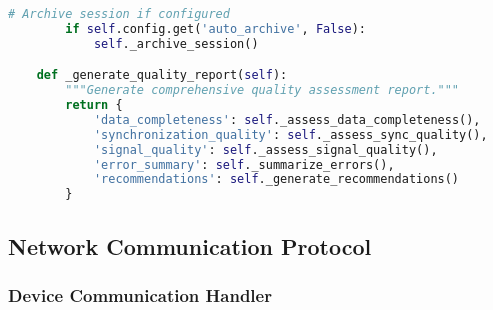 \begin{lstlisting}[language=Python, caption=Session Management Implementation]
        # Archive session if configured
        if self.config.get('auto_archive', False):
            self._archive_session()

    def _generate_quality_report(self):
        """Generate comprehensive quality assessment report."""
        return {
            'data_completeness': self._assess_data_completeness(),
            'synchronization_quality': self._assess_sync_quality(),
            'signal_quality': self._assess_signal_quality(),
            'error_summary': self._summarize_errors(),
            'recommendations': self._generate_recommendations()
        }
\end{lstlisting}

\subsection{Network Communication Protocol}

\subsubsection{Device Communication Handler}

